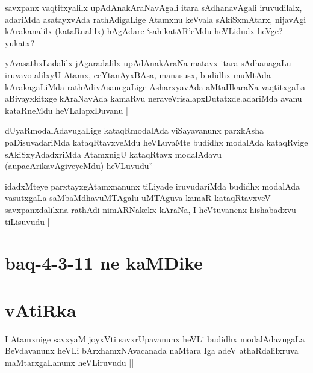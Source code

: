 \begin{artha}
savxpanx vaqtitxyalilx upAdAnakAraNavAgali itara sAdhanavAgali iruvudilalx, adariMda asatayxvAda rathAdigaLige Atamxnu keVvala sAkiSxmAtarx, nijavAgi kArakanalilx (kataRnalilx) hAgAdare `sahikatAR'eMdu heVLidudx heVge? yukatx?
\end{artha}

\begin{artha}
yAvasathxLadalilx jAgaradalilx upAdAnakAraNa matavx itara sAdhanagaLu iruvavo alilxyU Atamx, ceYtanAyxBAsa, manasusx, budidhx muMtAda kArakagaLiMda rathAdivAsanegaLige AsharxyavAda aMtaHkaraNa vaqtitxgaLa aBivayxkitxge kAraNavAda kamaRvu neraveVrisalapxDutatxde.adariMda avanu kataRneMdu heVLalapxDuvanu ||
\end{artha}


\begin{artha}
dUyaRmodalAdavugaLige kataqRmodalAda viSayavanunx parxkAsha paDisuvadariMda kataqRtavxveMdu heVLuvaMte budidhx modalAda kataqRvige sAkiSxyAdadxriMda AtamxnigU kataqRtavx modalAdavu (aupacArikavAgiveyeMdu) heVLuvudu''
\end{artha}


\begin{artha}
idadxMteye parxtayxgAtamxnanunx tiLiyade iruvudariMda budidhx modalAda vasutxgaLa saMbaMdhavuMTAgalu uMTAguva kamaR kataqRtavxveV savxpanxdalilxna rathAdi nimARNakekx  kAraNa, I heVtuvanenx hishabadxvu tiLisuvudu ||
\end{artha}

\section*{baq-4-3-11 ne kaMDike}

\section*{vAtiRka}

\begin{artha}
I Atamxnige savxyaM joyxVti savxrUpavanunx heVLi budidhx modalAdavugaLa BeVdavanunx heVLi bArxhamxNAvacanada naMtara Iga adeV athaRdalilxruva maMtarxgaLanunx heVLiruvudu ||
\end{artha}



